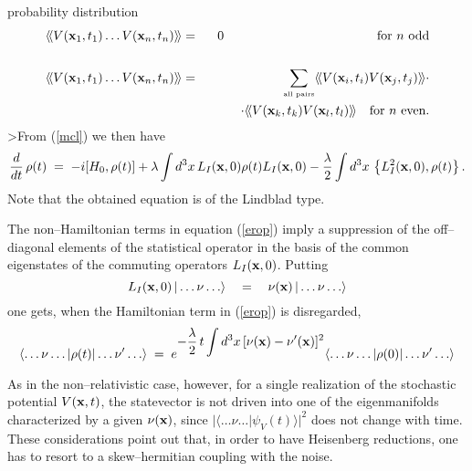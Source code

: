 \documentclass[12pt]{article}
\newcommand{\llangle}{\langle\!\langle}
\newcommand{\rrangle}{\rangle\!\rangle}
\begin{document}
probability distribution
\begin{eqnarray}
\llangle V({\bf x}_{1}, t_{1})\ldots V({\bf x}_{n}, t_{n})
\rrangle & = & 0 \quad\qquad\qquad\qquad\qquad\qquad\quad
\makebox{for $n$ odd} \nonumber \\
& & \\
\llangle V({\bf x}_{1}, t_{1})\ldots V({\bf x}_{n}, t_{n})
\rrangle & = & \sum_{\makebox{\tiny all pairs}} \llangle V({\bf
x}_{i}, t_{i}) V({\bf x}_{j}, t_{j})
\rrangle\cdot \nonumber \\
& & \qquad\;\; \cdot \llangle V({\bf x}_{k}, t_{k}) V({\bf x}_{l},
t_{l}) \rrangle \quad \makebox{for $n$ even.} \nonumber
\end{eqnarray}
>From (\ref{mcl}) we then have
\begin{equation} \label{erop}
\frac{d}{dt}\,\rho(t) \; = \; -i [H_{0}, \rho(t)] + \lambda \int
d^{3}x\, L_{I}({\bf x}, 0) \rho(t) L_{I}({\bf x}, 0) -
\frac{\lambda}{2} \int d^{3}x\, \left\{ L_{I}^{2}({\bf x}, 0),
\rho(t) \right\}.
\end{equation}
Note that the obtained equation is of the Lindblad type.

The non--Hamiltonian terms in equation (\ref{erop}) imply a
suppression of the off--diagonal elements of the statistical
operator in the basis of the common eigenstates of the commuting
operators $L_{I}({\bf x}, 0)$. Putting
\begin{equation}
L_{I}({\bf x}, 0)\, |\ldots \nu \ldots \rangle \quad = \quad
\nu({\bf x})\, |\ldots \nu \ldots \rangle
\end{equation}
one gets, when the Hamiltonian term in (\ref{erop}) is
disregarded,
\begin{equation}
\langle\ldots\nu\ldots|\rho(t)|\ldots\nu'\ldots\rangle\; = \;
e^{\displaystyle -\frac{\lambda}{2}\,t\int d^{3}x\, [\nu({\bf x})
- \nu'({\bf x})]^{2}}
\langle\ldots\nu\ldots|\rho(0)|\ldots\nu'\ldots\rangle
\end{equation}

As in the non--relativistic case, however, for a single
realization of the stochastic potential $V({\bf x}, t)$, the
statevector is not driven into one of the eigenmanifolds
characterized by a given $\nu({\bf x})$, since
$|\langle\ldots\nu\ldots|\psi_{V}(t) \rangle|^{2}$ does not change
with time. These considerations point out that, in order to have
Heisenberg reductions, one has to resort to a skew--hermitian
coupling with the noise.
\end{document}
